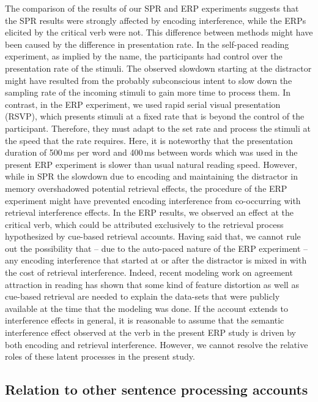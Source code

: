 \documentclass[review,preprint,12pt,authoryear,floatsintext]{elsarticle}
\begin{document}
{The comparison of the results of our SPR and ERP experiments suggests that the SPR results were strongly affected by encoding interference, while the ERPs elicited by the critical verb were not. This difference between methods might have been caused by the difference in presentation rate. In the self-paced reading experiment, as implied by the name, the participants had control over the presentation rate of the stimuli. The observed slowdown starting at the distractor  might have resulted from the probably subconscious intent to slow down the sampling rate of the incoming stimuli to gain more time to process them. In contrast, in the ERP experiment, we used rapid serial visual presentation (RSVP), which presents stimuli at a fixed rate that is beyond the control of the participant. Therefore, they must adapt to the set rate and process the stimuli at the speed that the rate requires. Here, it is noteworthy that the presentation duration of 500\,ms per word and 400\,ms between words which was used in the present ERP experiment is slower than usual natural reading speed. However, while in SPR the slowdown due to encoding and maintaining the distractor in memory overshadowed potential retrieval effects, the procedure of the ERP experiment might have prevented encoding interference from co-occurring with retrieval interference effects. In the ERP results, we observed an effect at the critical verb, which could be attributed exclusively to the retrieval process hypothesized by cue-based retrieval accounts. Having said that, we cannot rule out the possibility that -- due to the auto-paced nature of the ERP experiment -- any encoding interference that started at or after the distractor is mixed in with the cost of retrieval interference. Indeed, recent modeling work on agreement attraction in reading \citep{Yadavetal2022} has shown that some kind of feature distortion as well as cue-based retrieval are needed to explain the data-sets that were publicly available at the time that the modeling was done. If the  \cite{Yadavetal2022} account extends to interference effects in general, 
it is reasonable to assume that the semantic interference effect observed at the verb in the present ERP study is driven by both encoding and retrieval interference. However, we cannot resolve the relative roles of these latent processes in the present study.


\subsection{Relation to other sentence processing accounts}

}
\end{document}
